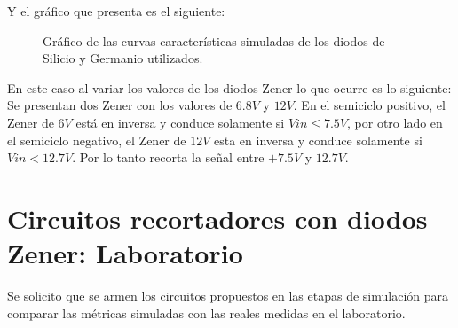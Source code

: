 \documentclass[chaptersright]{informeutn}
\begin{document}
          Y el gráfico que presenta es el siguiente:
          \begin{figure}[!ht]
            \centering
            \caption{Gráfico de las curvas características simuladas de los diodos de Silicio y Germanio utilizados.}
            \label{graph.simulation.recortador.ftf}
          \end{figure}

          En este caso al variar los valores de los diodos Zener lo que ocurre es lo siguiente: Se presentan dos
          Zener con los valores de $6.8V$ y $12V$. En el semiciclo positivo, el Zener de $6V$ está en inversa y
          conduce solamente si $Vin \leq 7.5V$, por otro lado en el semiciclo negativo, el Zener de $12V$ esta en
          inversa y conduce solamente si $Vin < 12.7V$. Por lo tanto recorta la señal entre $+7.5V$ y $12.7V$.

    \chapter{Circuitos recortadores con diodos Zener: Laboratorio}
      Se solicito que se armen los circuitos propuestos en las etapas de simulación para comparar las métricas
      simuladas con las reales medidas en el laboratorio.
\end{document}
